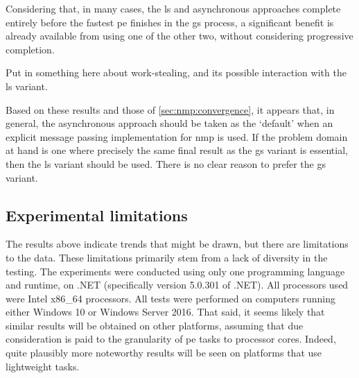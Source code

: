Considering that, in many cases, the \gls{ls} and asynchronous approaches complete entirely before the fastest \gls{pe} finishes in the \gls{gs} process, a significant benefit is already available from using one of the other two, without considering progressive completion.

\begin{anfxnote}
Put in something here about work-stealing, and its possible interaction with the \gls{ls} variant.
\end{anfxnote}


Based on these results and those of \autoref{sec:nmp:convergence}, it appears that, in general, the asynchronous approach should be taken as the `default' when an explicit message passing implementation for \gls{nmp} is used.  If the problem domain at hand is one where precisely the same final result as the \gls{gs} variant is essential, then the \gls{ls} variant should be used.  There is no clear reason to prefer the \gls{gs} variant.

\subsection{Experimental limitations}
The results above indicate trends that might be drawn, but there are limitations to the data.  These limitations primarily stem from a lack of diversity in the testing.  The experiments were conducted using only one programming language and runtime, \csharp{} on .NET (specifically version 5.0.301 of .NET).  All processors used were Intel x86\_64 processors.  All tests were performed on computers running either Windows 10 or Windows Server 2016.  That said, it seems likely that similar results will be obtained on other platforms, assuming that due consideration is paid to the granularity of \gls{pe} tasks to processor cores.  Indeed, quite plausibly more noteworthy results will be seen on platforms that use lightweight tasks.

